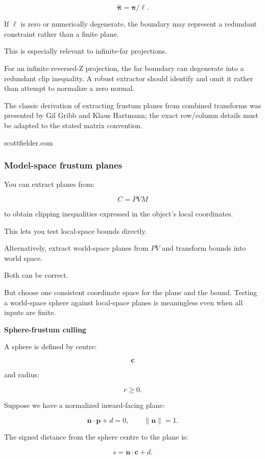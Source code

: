 \[
 \boxed{ \hat{\boldsymbol\pi}=\boldsymbol\pi/\ell }.
\]

If \(\ell\) is zero or numerically degenerate, the boundary may represent a redundant constraint rather than a finite plane.

This is especially relevant to infinite-far projections.

For an infinite reversed-Z projection, the far boundary can degenerate into a redundant clip inequality. A robust extractor should identify and omit it rather than attempt to normalize a zero normal.

The classic derivation of extracting frustum planes from combined transforms was presented by Gil Gribb and Klaus Hartmann; the exact row/column details must be adapted to the stated matrix convention. 

scottfielder.com

\subsubsection{Model-space frustum planes}\label{model-space-frustum-planes}

You can extract planes from:

\[
 C=PVM
\]

to obtain clipping inequalities expressed in the object's local coordinates.

This lets you test local-space bounds directly.

Alternatively, extract world-space planes from \(PV\) and transform bounds into world space.

Both can be correct.

But choose one consistent coordinate space for the plane and the bound. Testing a world-space sphere against local-space planes is meaningless even when all inputs are finite.

\textbf{Sphere-frustum culling}

A sphere is defined by centre:

\[
 \mathbf c
\]

and radius:

\[
 r\ge0.
\]

Suppose we have a normalized inward-facing plane:

\[
 \mathbf n\cdot\mathbf p+d=0, \qquad \|\mathbf n\|=1.
\]

The signed distance from the sphere centre to the plane is:

\[
 \boxed{ s=\mathbf n\cdot\mathbf c+d }.
\]

